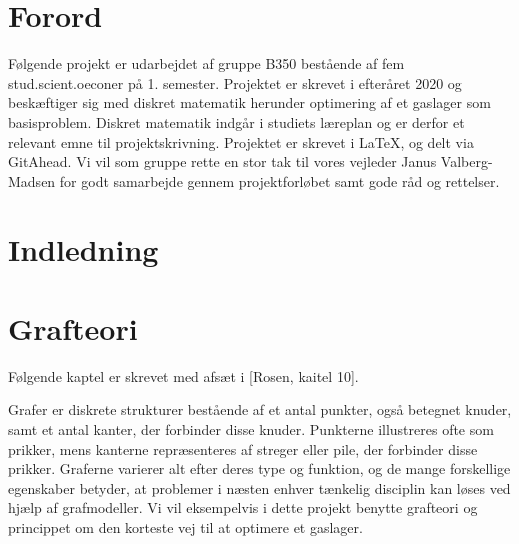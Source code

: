 \documentclass[11pt,a4paper,twoside,openright,danish]{book}
\theoremstyle{definition}
\begin{document}
\frontmatter


\tableofcontents

\mainmatter
\chapter{Forord}
Følgende projekt er udarbejdet af gruppe B350 bestående af fem stud.scient.oeconer på 1. semester. Projektet er skrevet i efteråret 2020 og beskæftiger sig med diskret matematik herunder optimering af et gaslager som basisproblem. Diskret matematik indgår i studiets læreplan og er derfor et relevant emne til projektskrivning. Projektet er skrevet i \LaTeX, og delt via GitAhead.
Vi vil som gruppe rette en stor tak til vores vejleder Janus Valberg-Madsen for godt samarbejde gennem projektforløbet samt gode råd og rettelser.


\chapter{Indledning}


\chapter{Grafteori}
Følgende kaptel er skrevet med afsæt i [Rosen, kaitel 10].

Grafer er diskrete strukturer bestående af et antal punkter, også betegnet knuder, samt et antal kanter, der forbinder disse knuder. Punkterne illustreres ofte som prikker, mens kanterne repræsenteres af streger eller pile, der forbinder disse prikker. Graferne varierer alt efter deres type og funktion, og de mange forskellige egenskaber betyder, at problemer i næsten enhver tænkelig disciplin kan løses ved hjælp af grafmodeller. Vi vil eksempelvis i dette projekt benytte grafteori og princippet om den korteste vej til at optimere et gaslager.
\end{document}
